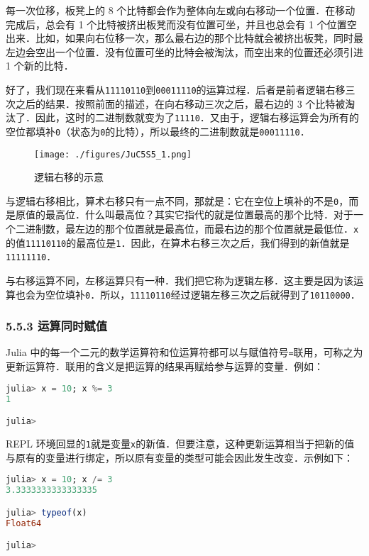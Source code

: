 每一次位移，板凳上的 8 个比特都会作为整体向左或向右移动一个位置．在移动完成后，总会有 1 个比特被挤出板凳而没有位置可坐，并且也总会有 1 个位置空出来．比如，如果向右位移一次，那么最右边的那个比特就会被挤出板凳，同时最左边会空出一个位置．没有位置可坐的比特会被淘汰，而空出来的位置还必须引进 1 个新的比特．

好了，我们现在来看从\verb|11110110|到\verb|00011110|的运算过程．后者是前者逻辑右移三次之后的结果．按照前面的描述，在向右移动三次之后，最右边的 3 个比特被淘汰了．因此，这时的二进制数就变为了\verb|11110|．又由于，逻辑右移运算会为所有的空位都填补\verb|0|（状态为\verb|0|的比特），所以最终的二进制数就是\verb|00011110|．
\begin{figure}[ht]
\centering
\texttt{[image: ./figures/JuC5S5\_1.png]}
\caption{逻辑右移的示意} \label{JuC5S5_fig1}
\end{figure}

与逻辑右移相比，算术右移只有一点不同，那就是：它在空位上填补的不是\verb|0|，而是原值的最高位．什么叫最高位？其实它指代的就是位置最高的那个比特．对于一个二进制数，最左边的那个位置就是最高位，而最右边的那个位置就是最低位．\verb|x|的值\verb|11110110|的最高位是\verb|1|．因此，在算术右移三次之后，我们得到的新值就是\verb|11111110|．

与右移运算不同，左移运算只有一种．我们把它称为逻辑左移．这主要是因为该运算也会为空位填补\verb|0|．所以，\verb|11110110|经过逻辑左移三次之后就得到了\verb|10110000|．

\subsubsection{5.5.3 运算同时赋值}

Julia 中的每一个二元的数学运算符和位运算符都可以与赋值符号\verb|=|联用，可称之为更新运算符．联用的含义是把运算的结果再赋给参与运算的变量．例如：
\begin{lstlisting}[language=julia]
julia> x = 10; x %= 3
1

julia>
\end{lstlisting}

REPL 环境回显的\verb|1|就是变量\verb|x|的新值．但要注意，这种更新运算相当于把新的值与原有的变量进行绑定，所以原有变量的类型可能会因此发生改变．示例如下：
\begin{lstlisting}[language=julia]
julia> x = 10; x /= 3
3.3333333333333335

julia> typeof(x)
Float64

julia> 
\end{lstlisting}

